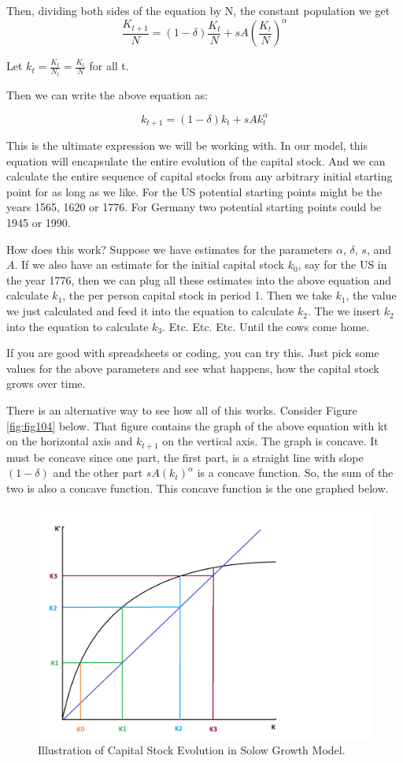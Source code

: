 \documentclass[
]{book}
\begin{document}
Then, dividing both sides of the equation by N, the constant population we get
\[\frac{K_{t+1}}{N}=(1-\delta)\frac{K_t}{N}+sA(\frac{K_t}{N})^\alpha\]

Let \(k_t=\frac{K_t}{N_t} = \frac{K_t}{N}\) for all t.

Then we can write the above equation as:

\[k_{t+1}=(1-\delta) k_t+s A k_t^α\]

This is the ultimate expression we will be working with. In our model, this equation will encapsulate the entire evolution of the capital stock. And we can calculate the entire sequence of capital stocks from any arbitrary initial starting point for as long as we like. For the US potential starting points might be the years 1565, 1620 or 1776. For Germany two potential starting points could be 1945 or 1990.

How does this work? Suppose we have estimates for the parameters \(\alpha\), \(\delta\), \(s\), and \(A\). If we also have an estimate for the initial capital stock \(k_0\), say for the US in the year 1776, then we can plug all these estimates into the above equation and calculate \(k_1\), the per person capital stock in period 1. Then we take \(k_1\), the value we just calculated and feed it into the equation to calculate \(k_2\). The we insert \(k_2\) into the equation to calculate \(k_3\).
Etc.
Etc.
Etc.
Until the cows come home.

If you are good with spreadsheets or coding, you can try this. Just pick some values for the above parameters and see what happens, how the capital stock grows over time.

There is an alternative way to see how all of this works. Consider Figure \ref{fig:fig104} below. That figure contains the graph of the above equation with kt on the horizontal axis and \(k_{t+1}\) on the vertical axis.
The graph is concave. It must be concave since one part, the first part, is a straight line with slope \((1 - \delta)\) and the other part \(sA(k_t)^\alpha\) is a concave function. So, the sum of the two is also a concave function. This concave function is the one graphed below.

\begin{figure}
\includegraphics[width=1\linewidth]{img/ch1/k3} \caption{Illustration of Capital Stock Evolution in Solow Growth Model.}\label{fig:fig4}
\end{figure}
\end{document}

